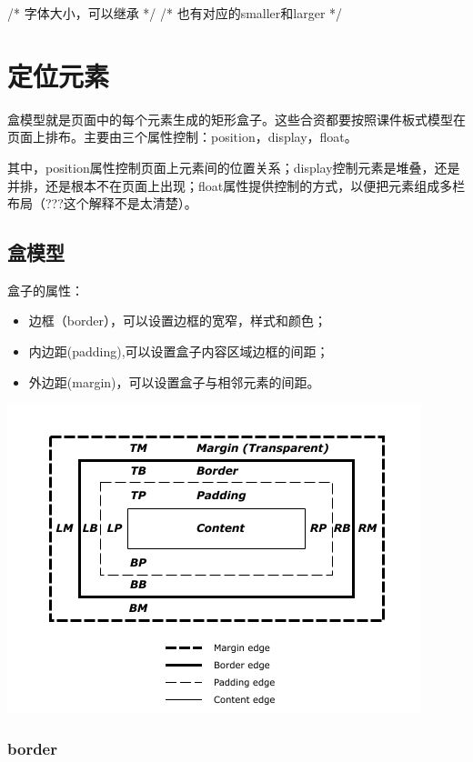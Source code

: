\begin{CSS}

/* 字体大小，可以继承 */
/* 也有对应的smaller和larger */



\end{CSS}
\section{定位元素}

盒模型就是页面中的每个元素生成的矩形盒子。这些合资都要按照课件板式模型在页面上排布。主要由三个属性控制：position，display，float。

其中，position属性控制页面上元素间的位置关系；display控制元素是堆叠，还是并排，还是根本不在页面上出现；float属性提供控制的方式，以便把元素组成多栏布局（???这个解释不是太清楚）。

\subsection{盒模型}

盒子的属性：
\begin{itemize}
\item 边框（border），可以设置边框的宽窄，样式和颜色；
\item 内边距(padding),可以设置盒子内容区域边框的间距；
\item 外边距(margin)，可以设置盒子与相邻元素的间距。
\end{itemize}

\includegraphics[scale=1]{css/resources/box-mode.png}




\subsubsection{border}

